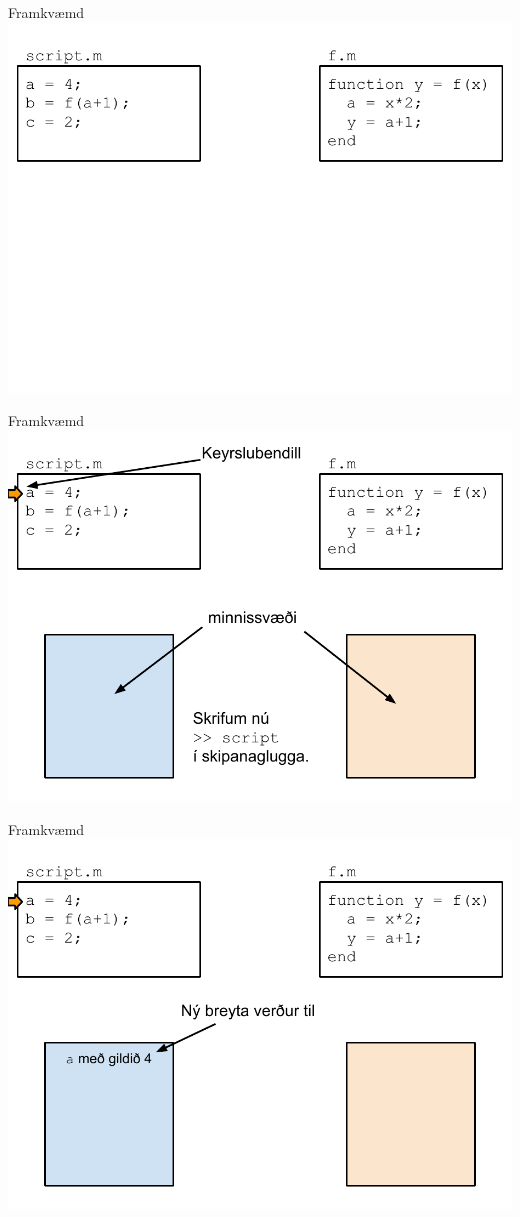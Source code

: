 \documentclass{beamer}
\begin{document}
\begin{frame}{Framkvæmd}
\includegraphics[width=\textwidth]{../Pics/framkvaemd-falls-0}
\end{frame}
\begin{frame}{Framkvæmd}
\includegraphics[width=\textwidth]{../Pics/framkvaemd-falls-1}
\end{frame}
\begin{frame}{Framkvæmd}
\includegraphics[width=\textwidth]{../Pics/framkvaemd-falls-2}
\end{frame}
\end{document}
